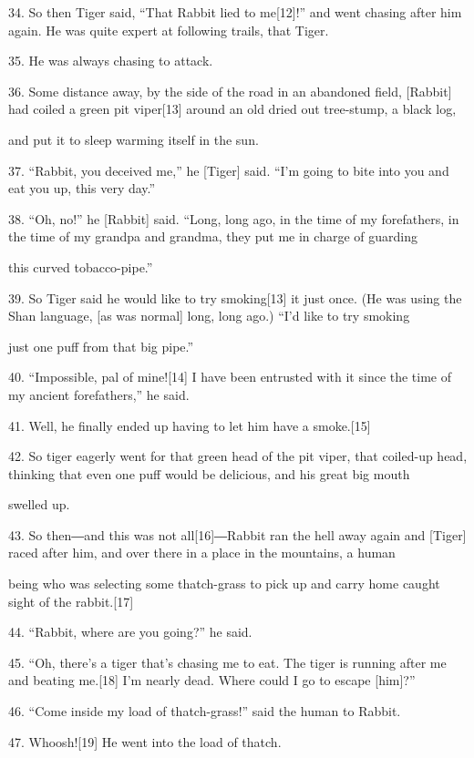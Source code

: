 {34. So then Tiger said, ``That Rabbit lied to me[12]!'' and went chasing
after him again. He was quite expert at following trails, that Tiger.}

{35. He was always chasing to attack.}

{36. Some distance away, by the side of the road in an abandoned field,
[Rabbit] had coiled a green pit viper[13] around an old dried out tree-stump, a
black log,       }

{and put it to sleep warming itself in the sun.}

{37. ``Rabbit, you deceived me,'' he [Tiger] said. ``I'm going to bite into
you and eat you up, this very day.''}

{38. ``Oh, no!'' he [Rabbit] said. ``Long, long ago, in the time of my forefathers,
in the time of my grandpa and grandma, they put me in charge of guarding      }

{this  curved tobacco-pipe.''}

{39. So Tiger said he would like to try smoking[13] it just once. (He was
using the Shan language, [as was normal] long, long ago.) ``I'd like to try smoking
}

{just one  puff from that big pipe.''}

{40. ``Impossible, pal of mine![14] I have been entrusted with it since
the time of my ancient forefathers,'' he said.}

{41. Well, he finally ended up having to let him have a smoke.[15]}

{42. So tiger eagerly went for that green head of the pit viper, that coiled-up
head, thinking that even one puff would be delicious, and his great big mouth
}

{swelled up.}

{43. So then―and this was not all[16]―Rabbit ran the hell away again
and [Tiger] raced after him, and over there in a place in the mountains, a human
}

{being who was selecting some thatch-grass to pick up and carry home caught
sight of the rabbit.[17]}

{44. ``Rabbit, where are you going?'' he said.}

{45. ``Oh, there's a tiger that's chasing me to eat. The tiger is running
after me and beating me.[18] I'm nearly dead. Where could I go to escape [him]?''}

{46. ``Come inside my load of thatch-grass!'' said the human to Rabbit.}

{47. Whoosh![19] He went into the load of thatch.}

